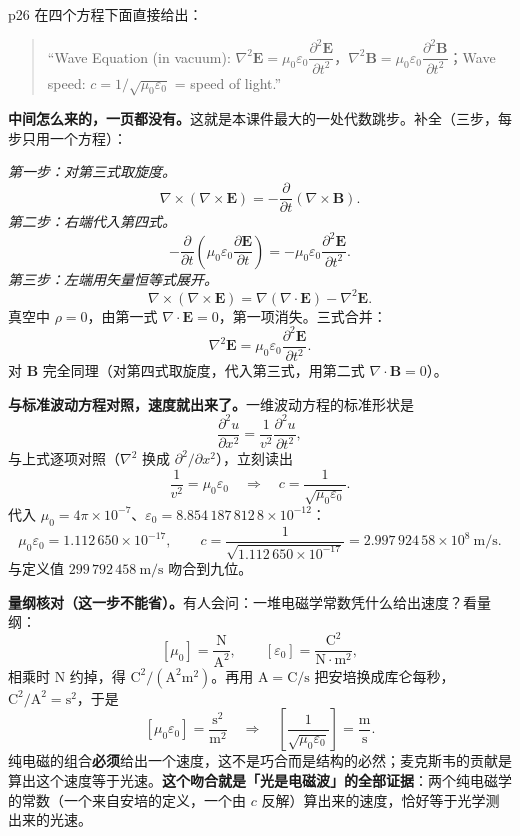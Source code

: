 \documentclass[11pt]{ctexart}
\newcommand{\cpage}[1]{\textsf{p#1}}
\begin{document}

\cpage{26} 在四个方程下面直接给出：

\begin{quote}
``Wave Equation (in vacuum): $\nabla^2\mathbf{E}=\mu_0\varepsilon_0\dfrac{\partial^2\mathbf{E}}{\partial t^2}$，$\nabla^2\mathbf{B}=\mu_0\varepsilon_0\dfrac{\partial^2\mathbf{B}}{\partial t^2}$；Wave speed: $c=1/\sqrt{\mu_0\varepsilon_0}$ = speed of light.''
\end{quote}

\textbf{中间怎么来的，一页都没有。}这就是本课件最大的一处代数跳步。补全（三步，每步只用一个方程）：

\emph{第一步：对第三式取旋度。}
\[
\nabla\times(\nabla\times\mathbf{E})=-\frac{\partial}{\partial t}(\nabla\times\mathbf{B}).
\]
\emph{第二步：右端代入第四式。}
\[
-\frac{\partial}{\partial t}\left(\mu_0\varepsilon_0\frac{\partial\mathbf{E}}{\partial t}\right)
=-\mu_0\varepsilon_0\frac{\partial^2\mathbf{E}}{\partial t^2}.
\]
\emph{第三步：左端用矢量恒等式展开。}
\[
\nabla\times(\nabla\times\mathbf{E})=\nabla(\nabla\cdot\mathbf{E})-\nabla^2\mathbf{E}.
\]
真空中 $\rho=0$，由第一式 $\nabla\cdot\mathbf{E}=0$，第一项消失。三式合并：
\[
\nabla^2\mathbf{E}=\mu_0\varepsilon_0\frac{\partial^2\mathbf{E}}{\partial t^2}.
\]
对 $\mathbf{B}$ 完全同理（对第四式取旋度，代入第三式，用第二式 $\nabla\cdot\mathbf{B}=0$）。


\textbf{与标准波动方程对照，速度就出来了。}一维波动方程的标准形状是
\[
\frac{\partial^2 u}{\partial x^2}=\frac{1}{v^2}\frac{\partial^2 u}{\partial t^2},
\]
与上式逐项对照（$\nabla^2$ 换成 $\partial^2/\partial x^2$），立刻读出
\[
\frac{1}{v^2}=\mu_0\varepsilon_0\quad\Longrightarrow\quad c=\frac{1}{\sqrt{\mu_0\varepsilon_0}}.
\]
代入 $\mu_0=4\pi\times10^{-7}$、$\varepsilon_0=8.854\,187\,812\,8\times10^{-12}$：
\[
\mu_0\varepsilon_0=1.112\,650\times10^{-17},\qquad
c=\frac{1}{\sqrt{1.112\,650\times10^{-17}}}=2.997\,924\,58\times10^{8}\ \mathrm{m/s}.
\]
与定义值 $299\,792\,458\ \mathrm{m/s}$ 吻合到九位。

\textbf{量纲核对（这一步不能省）。}有人会问：一堆电磁学常数凭什么给出速度？看量纲：
\[
[\mu_0]=\frac{\mathrm{N}}{\mathrm{A^2}},\qquad
[\varepsilon_0]=\frac{\mathrm{C^2}}{\mathrm{N\cdot m^2}},
\]
相乘时 $\mathrm{N}$ 约掉，得 $\mathrm{C^2/(A^2m^2)}$。再用 $\mathrm{A}=\mathrm{C/s}$ 把安培换成库仑每秒，$\mathrm{C^2/A^2}=\mathrm{s^2}$，于是
\[
[\mu_0\varepsilon_0]=\frac{\mathrm{s^2}}{\mathrm{m^2}}
\quad\Longrightarrow\quad
\left[\frac{1}{\sqrt{\mu_0\varepsilon_0}}\right]=\frac{\mathrm{m}}{\mathrm{s}} .
\]
纯电磁的组合\textbf{必须}给出一个速度，这不是巧合而是结构的必然；麦克斯韦的贡献是算出这个速度等于光速。\textbf{这个吻合就是「光是电磁波」的全部证据}：两个纯电磁学的常数（一个来自安培的定义，一个由 $c$ 反解）算出来的速度，恰好等于光学测出来的光速。
\end{document}
